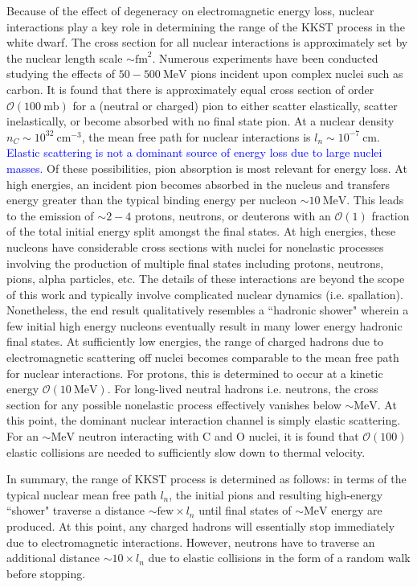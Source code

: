 \documentclass[11 pt, preprint,preprintnumbers,amsmath,amssymb, prd]{revtex4}
\newcommand{\OO}{\mathcal{O}}
\begin{document}
Because of the effect of degeneracy on electromagnetic energy loss, nuclear interactions play a key role in determining the range of the KKST process in the white dwarf. The cross section for all nuclear interactions is approximately set by the nuclear length scale $\sim \text{fm}^2$. Numerous experiments have been conducted studying the effects of $50 - 500 ~\text{MeV}$ pions incident upon complex nuclei such as carbon. It is found that there is approximately equal cross section of order $\OO(100 ~\text{mb})$ for a (neutral or charged) pion to either scatter elastically, scatter inelastically, or become absorbed with no final state pion. At a nuclear density $n_C \sim 10^{32} ~\text{cm}^{-3}$, the mean free path for nuclear interactions is $l_n \sim 10^{-7} ~\text{cm}$. \textcolor{blue}{Elastic scattering is not a dominant source of energy loss due to large nuclei masses.} Of these possibilities, pion absorption is most relevant for energy loss. At high energies, an incident pion becomes absorbed in the nucleus and transfers energy greater than the typical binding energy per nucleon $\sim 10 ~\text{MeV}$. This leads to the emission of $\sim 2-4$ protons, neutrons, or deuterons with an $\OO(1)$ fraction of the total initial energy split amongst the final states. At high energies, these nucleons have considerable cross sections with nuclei for nonelastic processes involving the production of multiple final states including protons, neutrons, pions, alpha particles, etc. The details of these interactions are beyond the scope of this work and typically involve complicated nuclear dynamics (i.e. spallation). Nonetheless, the end result qualitatively resembles a ``hadronic shower" wherein a few initial high energy nucleons eventually result in many lower energy hadronic final states. At sufficiently low energies, the range of charged hadrons due to electromagnetic scattering off nuclei becomes comparable to the mean free path for nuclear interactions. For protons, this is determined to occur at a kinetic energy $\OO(10 ~\text{MeV})$. For long-lived neutral hadrons i.e. neutrons, the cross section for any possible nonelastic process effectively vanishes below $\sim \text{MeV}$. At this point, the dominant nuclear interaction channel is simply elastic scattering. For an $\sim \text{MeV}$ neutron interacting with C and O nuclei, it is found that $\OO(100)$ elastic collisions are needed to sufficiently slow down to thermal velocity. 

In summary, the range of KKST process is determined as follows: in terms of the typical nuclear mean free path $l_n$, the initial pions and resulting high-energy ``shower" traverse a distance $\sim \text{few} \times l_n$ until final states of $\sim \text{MeV}$ energy are produced. At this point, any charged hadrons will essentially stop immediately due to electromagnetic interactions. However, neutrons have to traverse an additional distance $\sim 10 \times l_n$ due to elastic collisions in the form of a random walk before stopping. 
\end{document}
